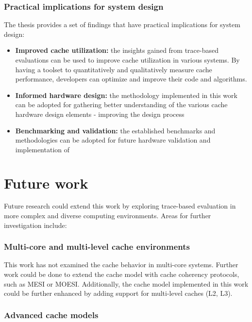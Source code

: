 \subsubsection*{Practical implications for system design}

The thesis provides a set of findings that have practical implications for system design:

\begin{itemize}
	\item \textbf{Improved cache utilization:} the insights gained from trace-based evaluations can be used to improve cache utilization in various systems. By having a toolset to
		quantitatively and qualitatively measure cache performance, developers can optimize and improve their code and algorithms.
	\item \textbf{Informed hardware design:} the methodology implemented in this work can be adopted for gathering better understanding of the various cache hardware design elements -
		improving the design process
	\item \textbf{Benchmarking and validation:} the established benchmarks and methodologies can be adopted for future hardware validation and implementation of 
\end{itemize}

\section{Future work}

Future research could extend this work by exploring trace-based evaluation in more complex and diverse computing environments. Areas for further investigation include:

\subsubsection*{Multi-core and multi-level cache environments}

This work has not examined the cache behavior in multi-core systems. Further work could be done to extend the cache model with cache coherency protocols, such as MESI or MOESI.
Additionally, the cache model implemented in this work could be further enhanced by adding support for multi-level caches (L2, L3).


\subsubsection*{Advanced cache models}

